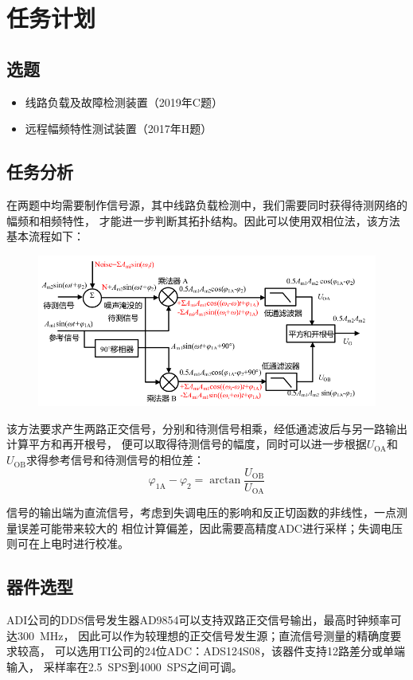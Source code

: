 \section{任务计划}
\subsection{选题}
\begin{itemize}
    \item 线路负载及故障检测装置（2019年C题）
    \item 远程幅频特性测试装置（2017年H题）
\end{itemize}

\subsection{任务分析}
在两题中均需要制作信号源，其中线路负载检测中，我们需要同时获得待测网络的幅频和相频特性，
才能进一步判断其拓扑结构。因此可以使用双相位法，该方法基本流程如下：

\begin{figure}[H]
\center
    \includegraphics[width=\textwidth]{img/biphasic.png}
\end{figure}

该方法要求产生两路正交信号，分别和待测信号相乘，经低通滤波后与另一路输出计算平方和再开根号，
便可以取得待测信号的幅度，同时可以进一步根据$U_\textrm{OA}$和$U_\textrm{OB}$求得参考信号和待测信号的相位差：
\begin{equation}
    \varphi_\textrm{1A}-\varphi_\textrm{2} =
    \arctan{\dfrac{U_\textrm{OB}}{U_\textrm{OA}}}
\end{equation}

信号的输出端为直流信号，考虑到失调电压的影响和反正切函数的非线性，一点测量误差可能带来较大的
相位计算偏差，因此需要高精度ADC进行采样；失调电压则可在上电时进行校准。

\subsection{器件选型}
ADI公司的DDS信号发生器AD9854可以支持双路正交信号输出，最高时钟频率可达\SI{300}{MHz}，
因此可以作为较理想的正交信号发生源；直流信号测量的精确度要求较高，
可以选用TI公司的24位ADC：ADS124S08，该器件支持12路差分或单端输入，
采样率在\SI{2.5}{SPS}到\SI{4000}{SPS}之间可调。

